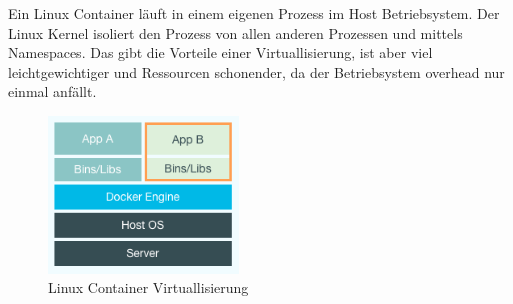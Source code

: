 Ein Linux Container läuft in einem eigenen Prozess im Host Betriebsystem. Der Linux Kernel isoliert
den Prozess von allen anderen Prozessen und mittels Namespaces. Das gibt die Vorteile einer
Virtuallisierung, ist aber viel leichtgewichtiger und Ressourcen schonender, da der Betriebsystem
overhead nur einmal anfällt.

\begin{figure}[htbp]
  \begin{center}
    \includegraphics[width=0.45\textwidth]{./images/docker_container.png}
    \caption{Linux Container Virtuallisierung}
    \label{img:docker_container}
  \end{center}
\end{figure}




